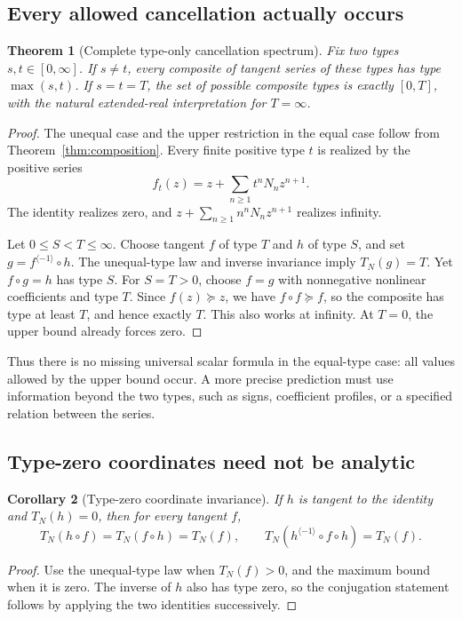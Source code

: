 \documentclass[11pt,a4paper]{article}
\numberwithin{equation}{section}
\newtheorem{theorem}{Theorem}[section]
\newtheorem{corollary}[theorem]{Corollary}
\theoremstyle{definition}
\theoremstyle{remark}
\newcommand{\Type}{T_N}
\newcommand{\inv}[1]{#1^{\langle-1\rangle}}
\begin{document}
\subsection{Every allowed cancellation actually occurs}

\begin{theorem}[Complete type-only cancellation spectrum]
\label{thm:cancellation}
Fix two types $s,t\in[0,\infty]$.
If $s\ne t$, every composite of tangent series of these types has type
$\max(s,t)$. If $s=t=T$, the set of possible composite types is exactly
$[0,T]$, with the natural extended-real interpretation for $T=\infty$.
\end{theorem}
\begin{proof}
The unequal case and the upper restriction in the equal case follow from
Theorem~\ref{thm:composition}. Every finite positive type $t$ is realized
by the positive series
\[
 f_t(z)=z+\sum_{n\ge1}t^nN_nz^{n+1}.
\]
The identity realizes zero, and
$z+\sum_{n\ge1}n^nN_nz^{n+1}$ realizes infinity.

Let $0\le S<T\le\infty$. Choose tangent $f$ of type $T$ and $h$ of
type $S$, and set $g=\inv f\circ h$. The unequal-type law and inverse
invariance imply $\Type(g)=T$. Yet $f\circ g=h$ has type $S$.
For $S=T>0$, choose $f=g$ with nonnegative nonlinear coefficients and
type $T$. Since $f(z)\succeq z$, we have $f\circ f\succeq f$, so
the composite has type at least $T$, and hence exactly $T$. This also
works at infinity. At $T=0$, the upper bound already forces zero.
\end{proof}

Thus there is no missing universal scalar formula in the equal-type case:
all values allowed by the upper bound occur. A more precise prediction
must use information beyond the two types, such as signs, coefficient
profiles, or a specified relation between the series.

\subsection{Type-zero coordinates need not be analytic}

\begin{corollary}[Type-zero coordinate invariance]
\label{cor:zerocoordinates}
If $h$ is tangent to the identity and $\Type(h)=0$, then for every
tangent $f$,
\begin{equation}
 \Type(h\circ f)=\Type(f\circ h)=\Type(f),
 \qquad
 \Type(\inv h\circ f\circ h)=\Type(f).
 \label{eq:zerocoordinates}
\end{equation}
\end{corollary}
\begin{proof}
Use the unequal-type law when $\Type(f)>0$, and the maximum bound when
it is zero. The inverse of $h$ also has type zero, so the conjugation
statement follows by applying the two identities successively.
\end{proof}
\end{document}
